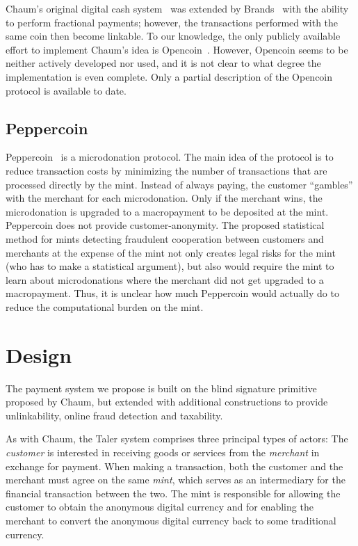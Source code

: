 \documentclass{llncs}
\begin{document}
Chaum's original digital cash system~\cite{chaum1983blind} was
extended by Brands~\cite{brands1993efficient} with the ability to
perform fractional payments; however, the transactions performed with
the same coin then become linkable.
%
%
To our knowledge, the only publicly available effort to implement
Chaum's idea is
Opencoin~\cite{dent2008extensions}.  However,
Opencoin seems to be neither actively developed nor used, and it is
not clear to what degree the implementation is even complete.  Only a
partial description of the Opencoin protocol is available to date.

\subsection{Peppercoin}

Peppercoin~\cite{rivest2004peppercoin} is a microdonation protocol.
The main idea of the protocol is to reduce transaction costs by
minimizing the number of transactions that are processed directly by
the mint.  Instead of always paying, the customer ``gambles'' with the
merchant for each microdonation.  Only if the merchant wins, the
microdonation is upgraded to a macropayment to be deposited at the
mint.  Peppercoin does not provide customer-anonymity.  The proposed
statistical method for mints detecting fraudulent cooperation between
customers and merchants at the expense of the mint not only creates
legal risks for the mint (who has to make a statistical argument), but
also would require the mint to learn about microdonations where the
merchant did not get upgraded to a macropayment.  Thus, it is unclear
how much Peppercoin would actually do to reduce the computational
burden on the mint.


\section{Design}

The payment system we propose is built on the blind signature
primitive proposed by Chaum, but extended with additional
constructions to provide unlinkability, online fraud detection and
taxability.

As with Chaum, the Taler system comprises three principal types of
actors: The \emph{customer} is interested in receiving goods or
services from the \emph{merchant} in exchange for payment.  When
making a transaction, both the customer and the merchant must agree on
the same \emph{mint}, which serves as an intermediary for the
financial transaction between the two.  The mint is responsible for
allowing the customer to obtain the anonymous digital currency and for
enabling the merchant to convert the anonymous digital currency back
to some traditional currency.
\end{document}
